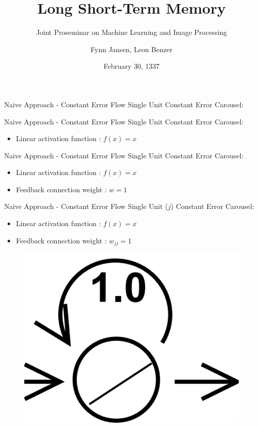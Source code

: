 \documentclass[10pt, aspectratio=169]{beamer}
\title{Long Short-Term Memory}
\subtitle{Joint Proseminar on Machine Learning and Image Processing}
\date{February 30, 1337}
\author{Fynn Jansen, Leon Benzer}
\institute{Chair of Computer Science 13 (Computer Vision)\\RWTH Aachen}
\begin{document}
\maketitle


\begin{frame}[t]{Naive Approach - Constant Error Flow}
    Single Unit Constant Error Carousel:
\end{frame}

\begin{frame}[t]{Naive Approach - Constant Error Flow}
    Single Unit Constant Error Carousel:
    \begin{itemize}
        \item Linear activation function : \begin{math}f(x)=x\end{math}
    \end{itemize}
\end{frame}

\begin{frame}[t]{Naive Approach - Constant Error Flow}
    Single Unit Constant Error Carousel:
    \begin{itemize}
        \item Linear activation function : \begin{math}f(x)=x\end{math}
        \item Feedback connection weight : \begin{math}w=1\end{math}
    \end{itemize}
\end{frame}

\begin{frame}[t]{Naive Approach - Constant Error Flow}
    Single Unit (\begin{math}j\end{math}) Constant Error Carousel:
    \begin{itemize}
        \item Linear activation function : \begin{math}f(x)=x\end{math}
        \item Feedback connection weight : \begin{math}w_{jj}=1\end{math}
    \end{itemize}
    \begin{figure}
        \centering
        \includegraphics[width=0.25\linewidth]{images/ConstantErrorCarousel.png}
    \end{figure}
\end{frame}
\end{document}
